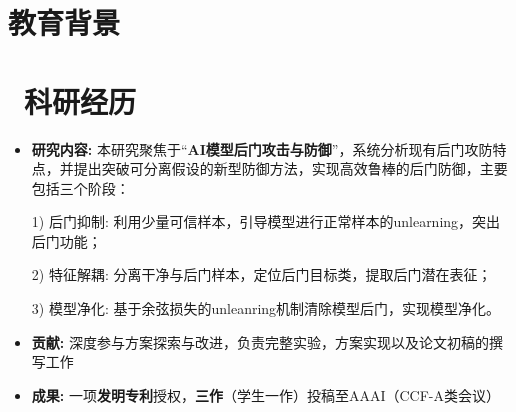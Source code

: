 \documentclass[8pt]{resume}
\begin{document}

\newcommand{\awarditem}[3]{%
  \item \makebox[0.9\textwidth][l]{#1 \hfill #2} \\[-0.8em]
  \textit{#3}
}



\section{\faGraduationCap 教育背景}

\section{\faCogs\ 科研经历}
\begin{itemize}
    \item \textbf{研究内容:}
    本研究聚焦于“\textbf{AI模型后门攻击与防御}”，系统分析现有后门攻防特点，并提出突破可分离假设的新型防御方法，实现高效鲁棒的后门防御，主要包括三个阶段：

    1) 后门抑制: 利用少量可信样本，引导模型进行正常样本的unlearning，突出后门功能；

    2) 特征解耦: 分离干净与后门样本，定位后门目标类，提取后门潜在表征；

    3) 模型净化: 基于余弦损失的unleanring机制清除模型后门，实现模型净化。

    \item \textbf{贡献:} 深度参与方案探索与改进，负责完整实验，方案实现以及论文初稿的撰写工作
    \item \textbf{成果:} 一项\textbf{发明专利}授权，\textbf{三作}（学生一作）投稿至AAAI（CCF-A类会议）

\end{itemize}
\end{document}
